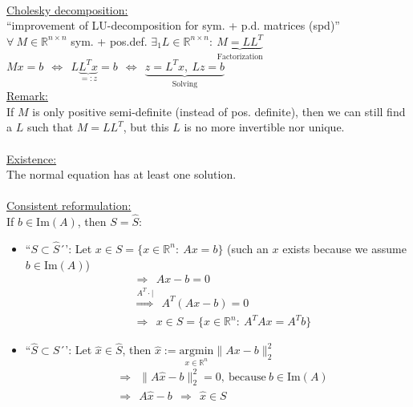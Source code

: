 \begin{frame}
	~\\
	{\blank
	\underline{Cholesky decomposition:}\\
	``improvement of LU-decomposition for sym. + p.d. matrices (spd)''\\
	$\forall~M\in\mathbb{R}^{n\times n}$ sym. + pos.def. $\exists_1L\in\mathbb{R}^{n\times n}:~\underbrace{M=LL^T}_{\text{Factorization}}$
	$Mx=b~~\Leftrightarrow~~L\underbrace{L^Tx}_{=:z}=b~~\Leftrightarrow~~\underbrace{z=L^Tx,~Lz=b}_{\text{Solving}}$\\
	\underline{Remark:}\\
	If $M$ is only positive semi-definite (instead of pos. definite), then we can still find a $L$ such that $M=LL^T$, but this $L$ is no more invertible nor unique.\\
	~\\
	\underline{Existence:}\checkmark\\
	The normal equation has at least one solution.\\
	~\\
	\underline{Consistent reformulation:}\\
	If $b\in\text{Im}(A)$, then $S=\widehat{S}$:
	\begin{itemize}\blank
		\item ``$ S   \subset\widehat{S}$´':
		Let $x\in S=\{x\in\mathbb{R}^n:~Ax=b\}$ (such an $x$ exists because we assume $b\in\text{Im}(A)$)
		\begin{align*}
		&\Rightarrow~~Ax-b=0\\
		&\stackrel{A^T\cdot|}{\Rightarrow}~~A^T(Ax-b)=0\\
		&\Rightarrow~~x\in S=\{x\in\mathbb{R}^n:~A^TAx=A^Tb\}
		\end{align*}
		\item ``$ \widehat{S} \subset S$´':
		Let $\widehat{x}\in\widehat{S}$, then $\widehat{x}:=\underset{x\in\mathbb{R}^n}{\mathrm{argmin}}\|Ax-b\|_2^2$
		\begin{align*}
		&\Rightarrow~~\|A\widehat{x}-b\|_2^2=0,~\text{because}~b\in\text{Im}(A)\\
		&\Rightarrow~~A\widehat{x}-b~~\Rightarrow~~\widehat{x}\in S
		\end{align*}
	\end{itemize}
}
\end{frame}